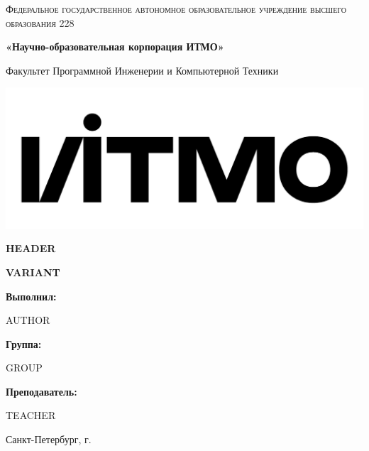 \documentclass[12pt,a4paper]{report}
\begin{document}
\begin{titlepage} 
	\centering
	{
        \scshape
        Федеральное государственное автономное образовательное учреждение высшего образования 228
        \par
        \textbf{«Научно-образовательная корпорация ИТМО»}
        \par
        \vspace*{1cm}
        Факультет Программной Инженерии и Компьютерной Техники
        \par
    }
    \vspace*{0.6cm}
    \includegraphics[width=\textwidth]{logo.png}
    {
        \Large
        \textbf{HEADER}
        \par
        \normalsize
        \vspace*{0.75cm}
        \textbf{VARIANT}
        \par
    }
    \vfill
    \hfill\begin{minipage}{\dimexpr\textwidth-7.8cm}
        \textbf{Выполнил:}\par
        AUTHOR\par
        \vspace*{0.15cm}
        \textbf{Группа:}\par
        GROUP\par
        \vspace*{0.15cm}
        \textbf{Преподаватель:}\par
        TEACHER\par
    \end{minipage}
    \vfill
    Санкт-Петербург, \the\year{}г.
\end{titlepage}  
\end{document}
